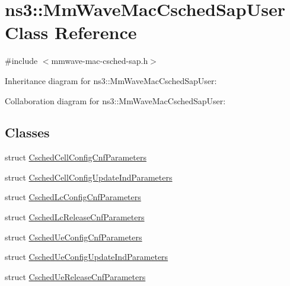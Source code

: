\hypertarget{classns3_1_1MmWaveMacCschedSapUser}{}\section{ns3\+:\+:Mm\+Wave\+Mac\+Csched\+Sap\+User Class Reference}
\label{classns3_1_1MmWaveMacCschedSapUser}


{\ttfamily \#include $<$mmwave-\/mac-\/csched-\/sap.\+h$>$}



Inheritance diagram for ns3\+:\+:Mm\+Wave\+Mac\+Csched\+Sap\+User\+:


Collaboration diagram for ns3\+:\+:Mm\+Wave\+Mac\+Csched\+Sap\+User\+:
\subsection*{Classes}
\begin{DoxyCompactItemize}
\item 
struct \hyperlink{structns3_1_1MmWaveMacCschedSapUser_1_1CschedCellConfigCnfParameters}{Csched\+Cell\+Config\+Cnf\+Parameters}
\item 
struct \hyperlink{structns3_1_1MmWaveMacCschedSapUser_1_1CschedCellConfigUpdateIndParameters}{Csched\+Cell\+Config\+Update\+Ind\+Parameters}
\item 
struct \hyperlink{structns3_1_1MmWaveMacCschedSapUser_1_1CschedLcConfigCnfParameters}{Csched\+Lc\+Config\+Cnf\+Parameters}
\item 
struct \hyperlink{structns3_1_1MmWaveMacCschedSapUser_1_1CschedLcReleaseCnfParameters}{Csched\+Lc\+Release\+Cnf\+Parameters}
\item 
struct \hyperlink{structns3_1_1MmWaveMacCschedSapUser_1_1CschedUeConfigCnfParameters}{Csched\+Ue\+Config\+Cnf\+Parameters}
\item 
struct \hyperlink{structns3_1_1MmWaveMacCschedSapUser_1_1CschedUeConfigUpdateIndParameters}{Csched\+Ue\+Config\+Update\+Ind\+Parameters}
\item 
struct \hyperlink{structns3_1_1MmWaveMacCschedSapUser_1_1CschedUeReleaseCnfParameters}{Csched\+Ue\+Release\+Cnf\+Parameters}
\end{DoxyCompactItemize}
